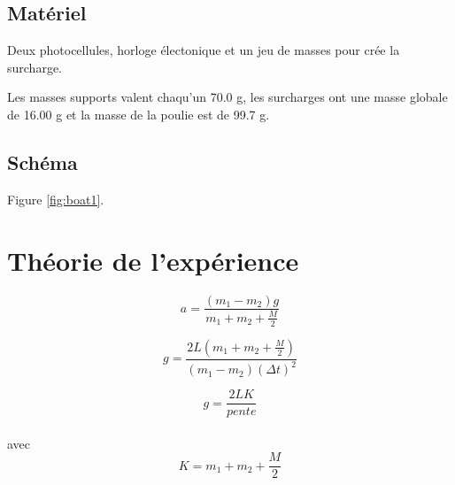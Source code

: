 \documentclass{article}
\begin{document}
\subsection{Matériel}
\begin{matériel_schéma}
Deux photocellules, horloge électonique et un jeu de masses pour crée la surcharge.

Les masses supports valent chaqu'un 70.0 g, les surcharges ont une masse globale de 16.00 g et la masse de la poulie est de 99.7 g.
\end{matériel_schéma}

\subsection{Schéma}


Figure \ref{fig:boat1}.

\section{Théorie de l'expérience}
\begin{enumerate}
    \begin{item}
        \begin{equation*}
        a = \frac{(m_{1} - m_{2})g}{m_{1} + m_{2} + \frac{M}{2}}
        \end{equation*}
    \end{item}
    \begin{item}
        \begin{equation*}
            g = \frac{2L(m_{1} + m_{2} + \frac{M}{2})}{(m_{1} - m_{2})({\Delta}t)^2}
        \end{equation*}
    \end{item}
    \begin{item}
          \begin{equation*} g = \frac{2LK}{pente}\end{equation*} \\ avec \\ \begin{equation*}K = m_{1} + m_{2} + \frac{M}{2}\end{equation*}
    \end{item}
\end{enumerate}


\end{document}
